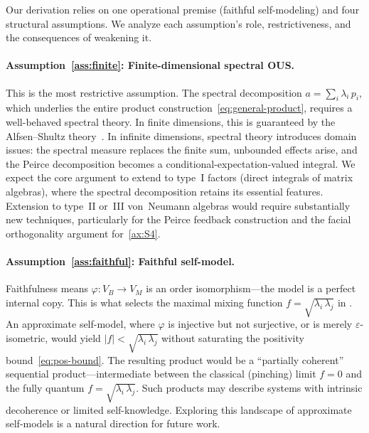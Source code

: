 Our derivation relies on one operational premise (faithful
self-modeling) and four structural assumptions.  We analyze each
assumption's role, restrictiveness, and the consequences of weakening
it.

\paragraph{Assumption~\ref{ass:finite}: Finite-dimensional spectral OUS.}
This is the most restrictive assumption.  The spectral decomposition
$a = \sum_{i} \lambda_{i}\, p_{i}$, which underlies the entire
product construction~\eqref{eq:general-product}, requires a
well-behaved spectral theory.  In finite dimensions, this is
guaranteed by the Alfsen--Shultz theory~\cite{AlfsenShultz2003}.  In
infinite dimensions, spectral theory introduces domain issues: the
spectral measure replaces the finite sum, unbounded effects arise, and
the Peirce decomposition becomes a conditional-expectation-valued
integral.  We expect the core argument to extend to type~I factors
(direct integrals of matrix algebras), where the spectral
decomposition retains its essential features.  Extension to type~II
or~III von~Neumann algebras would require substantially new techniques,
particularly for the Peirce feedback construction and the facial
orthogonality argument for~\ref{ax:S4}.

\paragraph{Assumption~\ref{ass:faithful}: Faithful self-model.}
Faithfulness means $\varphi: V_{B} \to V_{M}$ is an order
isomorphism---the model is a perfect internal copy.  This is what
selects the maximal mixing function
$f = \sqrt{\lambda_{i}\, \lambda_{j}}$ in
.  An approximate self-model, where
$\varphi$ is injective but not surjective, or is merely
$\varepsilon$-isometric, would yield $|f| < \sqrt{\lambda_{i}\,
\lambda_{j}}$ without saturating the positivity
bound~\eqref{eq:pos-bound}.  The resulting product would be a
``partially coherent'' sequential product---intermediate between the
classical (pinching) limit $f = 0$ and the fully quantum
$f = \sqrt{\lambda_{i}\, \lambda_{j}}$.  Such products may
describe systems with intrinsic decoherence or limited
self-knowledge.  Exploring this landscape of approximate self-models
is a natural direction for future work.

